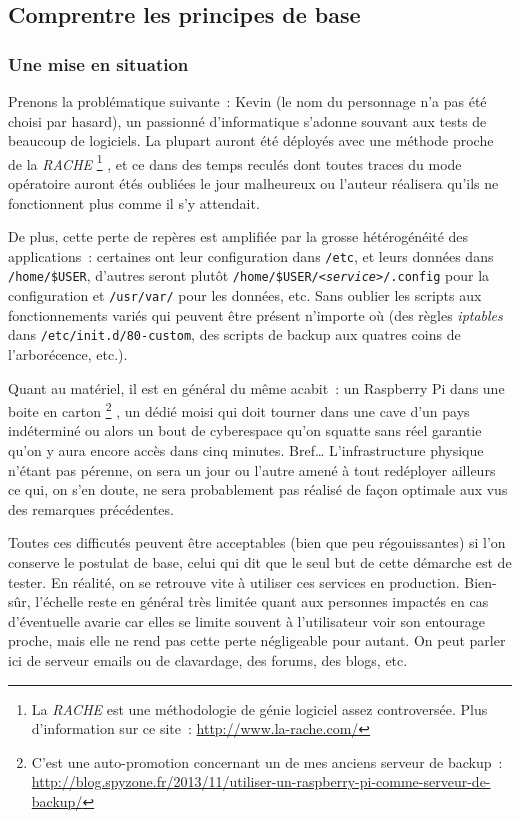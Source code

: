 \subsection{Comprentre les principes de base}
\subsubsection{Une mise en situation}

Prenons la problématique suivante~:
Kevin (le nom du personnage n'a pas été choisi par hasard), un passionné d'informatique s'adonne souvant aux tests de beaucoup de logiciels.
La plupart auront été déployés avec une méthode proche de la \emph{RACHE}%
\footnote{La \emph{RACHE} est une méthodologie de génie logiciel assez controversée. Plus d'information sur ce site~: \url{http://www.la-rache.com/}}%
, et ce dans des temps reculés dont toutes traces du mode opératoire auront étés oubliées le jour malheureux ou l'auteur réalisera qu'ils ne fonctionnent plus comme il s'y attendait.

De plus, cette perte de repères est amplifiée par la grosse hétérogénéité des applications~: certaines ont leur configuration dans {\tt/etc}, et leurs données dans {\tt/home/\$USER}, d'autres seront plutôt {\tt/home/\$USER/\emph{<service>}/.config} pour la configuration et {\tt/usr/var/} pour les données, etc.
Sans oublier les scripts aux fonctionnements variés qui peuvent être présent n'importe où (des règles \emph{iptables} dans {\tt/etc/init.d/80-custom}, des scripts de backup aux quatres coins de l'arborécence, etc.).

Quant au matériel, il est en général du même acabit~: un Raspberry Pi dans une boite en carton%
\footnote{C'est une auto-promotion concernant un de mes anciens serveur de backup~: \url{http://blog.spyzone.fr/2013/11/utiliser-un-raspberry-pi-comme-serveur-de-backup/}}%
, un dédié moisi qui doit tourner dans une cave d'un pays indéterminé ou alors un bout de cyberespace qu'on squatte sans réel garantie qu'on y aura encore accès dans cinq minutes.
Bref\dots{} L'infrastructure physique n'étant pas pérenne, on sera un jour ou l'autre amené à tout redéployer ailleurs ce qui, on s'en doute, ne sera probablement pas réalisé de façon optimale aux vus des remarques précédentes.

Toutes ces difficutés peuvent être acceptables (bien que peu régouissantes) si l'on conserve le postulat de base, celui qui dit que le seul but de cette démarche est de tester.
En réalité, on se retrouve vite à utiliser ces services en production.
Bien-sûr, l'échelle reste en général très limitée quant aux personnes impactés en cas d'éventuelle avarie car elles se limite souvent à l'utilisateur voir son entourage proche, mais elle ne rend pas cette perte négligeable pour autant.
On peut parler ici de serveur emails ou de clavardage, des forums, des blogs, etc.

